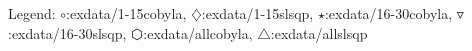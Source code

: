 Legend: {\color{NavyBlue}$\circ$}:exdata/1-15cobyla, {\color{Magenta}$\diamondsuit$}:exdata/1-15slsqp, {\color{Orange}$\star$}:exdata/16-30cobyla, {\color{CornflowerBlue}$\triangledown$}:exdata/16-30slsqp, {\color{red}$\varhexagon$}:exdata/allcobyla, {\color{YellowGreen}$\triangle$}:exdata/allslsqp